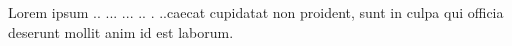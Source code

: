 Lorem ipsum .. ... ... .. . ..caecat cupidatat non proident, sunt in culpa qui officia deserunt mollit anim id est laborum.
